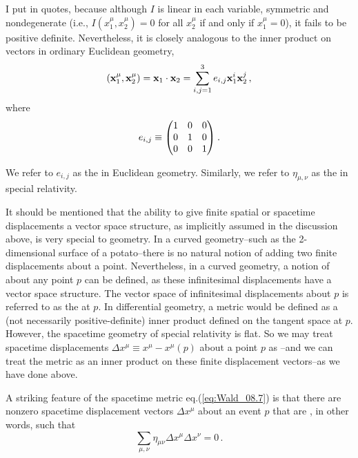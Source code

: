 I put  in quotes, because although $I$ is linear in each variable, symmetric and nondegenerate (i.e., $I(x_1^\mu, x_2^\mu) = 0$ for all $x_2^\mu$ if and only if $x_1^\mu = 0$), it fails to be positive definite. Nevertheless, it is closely analogous to the inner product on vectors in ordinary Euclidean geometry, 
\begin{equation}\label{eq:Wald_08.8}
(\vb{x}_1^\mu, \vb{x}_2^\mu) = \vb{x}_1 \cdot \vb{x}_2 = \sum_{i,j=1}^3 e_{i,j} \vb{x}^i_1 \vb{x}^j_2\,,
\end{equation}
where 
\begin{equation}\label{eq:Wald_08.9}
e_{i,j} \equiv \mqty( 1 & 0 & 0 \\
                      0 & 1 & 0 \\
                      0 & 0 & 1 )\:.
\end{equation}

We refer to $e_{i,j}$ as the  in Euclidean geometry. Similarly, we refer to $\eta_{\mu,\nu}$ as the  in special relativity. 

It should be mentioned that the ability to give finite spatial or spacetime displacements a vector space structure, as implicitly assumed in the discussion above, is very special to  geometry. In a curved geometry--such as the 2-dimensional surface of a potato--there is no natural notion of adding two finite displacements about a point. Nevertheless, in a curved geometry, a notion of  about any point $p$ can be defined, as these infinitesimal displacements have a vector space structure. The vector space of infinitesimal displacements about $p$ is referred to as the  at $p$. In differential geometry, a metric would be defined as a (not necessarily positive-definite) inner product defined on the tangent space at $p$. However, the spacetime geometry of special relativity is flat. So we may treat  spacetime displacements $\Delta x^\mu \equiv x^\mu - x^\mu(p)$ about a point $p$ as --and we can treat the metric as an inner product on these finite displacement vectors--as we have done above.

A striking feature of the spacetime metric eq.(\ref{eq:Wald_08.7}) is that there are nonzero spacetime displacement vectors $\Delta x^\mu$ about an event $p$ that are , in other words, such that 
\begin{equation}\label{eq:Wald_08.10}
\sum_{\mu, \nu} \eta_{\mu\nu} \Delta x^\mu \Delta x^\nu = 0\,.
\end{equation}

